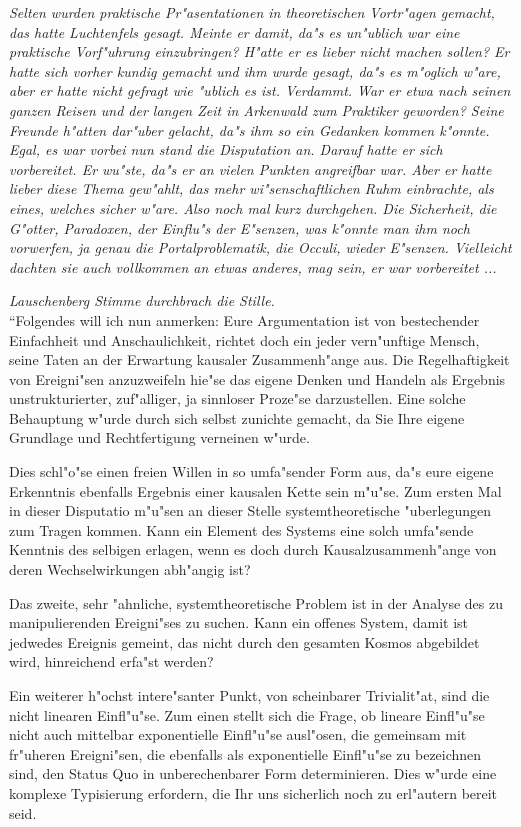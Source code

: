 \documentclass[a5paper,8pt]{book}
\begin{document}
\textit{Selten wurden praktische Pr"asentationen in theoretischen Vortr"agen gemacht, das hatte Luchtenfels gesagt. Meinte er damit, da"s es un"ublich war eine praktische Vorf"uhrung einzubringen? H"atte er es lieber nicht machen sollen? Er hatte sich vorher kundig gemacht und ihm wurde gesagt, da"s es m"oglich w"are, aber er hatte nicht gefragt wie "ublich es ist. Verdammt. War er etwa nach seinen ganzen Reisen und der langen Zeit in Arkenwald zum Praktiker geworden? Seine Freunde h"atten dar"uber gelacht, da"s ihm so ein Gedanken kommen k"onnte.
Egal, es war vorbei nun stand die Disputation an. Darauf hatte er sich vorbereitet. Er wu"ste, da"s er an vielen Punkten angreifbar war. Aber er hatte lieber diese Thema gew"ahlt, das mehr wi"senschaftlichen Ruhm einbrachte, als eines, welches sicher w"are.
Also noch mal kurz durchgehen. Die Sicherheit, die G"otter, Paradoxen, der Einflu"s der E"senzen, was k"onnte man ihm noch vorwerfen, ja genau die Portalproblematik, die Occuli, wieder E"senzen. Vielleicht dachten sie auch vollkommen an etwas anderes, mag sein, er war vorbereitet ... }

\textit{Lauschenberg Stimme durchbrach die Stille.}\\

``Folgendes will ich nun anmerken:
Eure Argumentation ist von bestechender Einfachheit und Anschaulichkeit, richtet doch ein jeder vern"unftige Mensch, seine Taten an der Erwartung kausaler Zusammenh"ange aus. 
Die Regelhaftigkeit von Ereigni"sen anzuzweifeln hie"se das eigene Denken und Handeln als Ergebnis unstrukturierter, zuf"alliger, ja sinnloser Proze"se darzustellen. Eine solche Behauptung w"urde durch sich selbst zunichte gemacht, da Sie Ihre eigene Grundlage und Rechtfertigung verneinen w"urde.

Dies schl"o"se einen freien Willen in so umfa"sender Form aus, da"s eure eigene Erkenntnis ebenfalls Ergebnis einer kausalen Kette sein m"u"se. 
Zum ersten Mal in dieser Disputatio m"u"sen an dieser Stelle systemtheoretische "uberlegungen zum Tragen kommen. 
Kann ein Element des Systems eine solch umfa"sende Kenntnis des selbigen erlagen, wenn es doch durch Kausalzusammenh"ange von deren Wechselwirkungen abh"angig ist?

Das zweite, sehr "ahnliche, systemtheoretische Problem ist in der Analyse des zu manipulierenden Ereigni"ses zu suchen. Kann ein offenes System, damit ist jedwedes Ereignis gemeint, das nicht durch den gesamten Kosmos abgebildet wird, hinreichend erfa"st werden? 

Ein weiterer h"ochst intere"santer Punkt, von scheinbarer Trivialit"at, sind die nicht linearen Einfl"u"se. Zum einen stellt sich die Frage, ob lineare Einfl"u"se nicht auch mittelbar exponentielle Einfl"u"se ausl"osen, die gemeinsam mit fr"uheren Ereigni"sen, die ebenfalls als exponentielle Einfl"u"se zu bezeichnen sind, den Status Quo in unberechenbarer Form determinieren. Dies w"urde eine komplexe Typisierung erfordern, die Ihr uns sicherlich noch zu erl"autern bereit seid.
\end{document}
